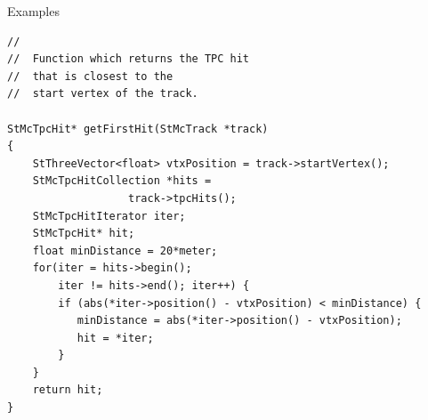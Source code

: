 \begin{Entry}
\item[Examples]   
{\footnotesize
\begin{verbatim}
//
//  Function which returns the TPC hit
//  that is closest to the
//  start vertex of the track.

StMcTpcHit* getFirstHit(StMcTrack *track)
{
    StThreeVector<float> vtxPosition = track->startVertex();
    StMcTpcHitCollection *hits =
                   track->tpcHits();
    StMcTpcHitIterator iter;
    StMcTpcHit* hit;
    float minDistance = 20*meter;
    for(iter = hits->begin();
        iter != hits->end(); iter++) {
        if (abs(*iter->position() - vtxPosition) < minDistance) {
           minDistance = abs(*iter->position() - vtxPosition);
           hit = *iter;
        }
    }
    return hit;
}

\end{verbatim}
}%
\end{Entry}

%
%
